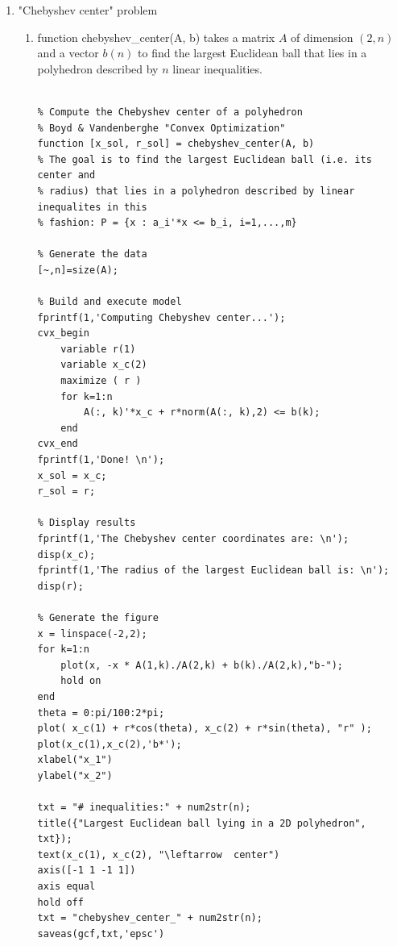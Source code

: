 \documentclass[10pt]{article}
\newcommand{\0}{\mat{0}}
\begin{document}
\begin{enumerate}
\item  "Chebyshev center" problem

\begin{enumerate}
\item function  chebyshev\_center(A, b) takes a matrix $A$ of dimension $(2,n)$ and a vector $b(n)$ to find the  largest Euclidean ball
that lies in a polyhedron described by $n$ linear inequalities.
 
\begin{verbatim}

% Compute the Chebyshev center of a polyhedron
% Boyd & Vandenberghe "Convex Optimization"
function [x_sol, r_sol] = chebyshev_center(A, b)
% The goal is to find the largest Euclidean ball (i.e. its center and
% radius) that lies in a polyhedron described by linear inequalites in this
% fashion: P = {x : a_i'*x <= b_i, i=1,...,m}

% Generate the data
[~,n]=size(A);

% Build and execute model
fprintf(1,'Computing Chebyshev center...');
cvx_begin
    variable r(1)
    variable x_c(2)
    maximize ( r )
    for k=1:n
        A(:, k)'*x_c + r*norm(A(:, k),2) <= b(k);
    end
cvx_end
fprintf(1,'Done! \n');
x_sol = x_c;
r_sol = r;

% Display results
fprintf(1,'The Chebyshev center coordinates are: \n');
disp(x_c);
fprintf(1,'The radius of the largest Euclidean ball is: \n');
disp(r);

% Generate the figure
x = linspace(-2,2);
for k=1:n
    plot(x, -x * A(1,k)./A(2,k) + b(k)./A(2,k),"b-");
    hold on
end
theta = 0:pi/100:2*pi;
plot( x_c(1) + r*cos(theta), x_c(2) + r*sin(theta), "r" );
plot(x_c(1),x_c(2),'b*');
xlabel("x_1")
ylabel("x_2")

txt = "# inequalities:" + num2str(n);
title({"Largest Euclidean ball lying in a 2D polyhedron", txt});
text(x_c(1), x_c(2), "\leftarrow  center")
axis([-1 1 -1 1])
axis equal
hold off
txt = "chebyshev_center_" + num2str(n);
saveas(gcf,txt,'epsc')

\end{verbatim}


\end{enumerate}
\end{enumerate}
\end{document}
